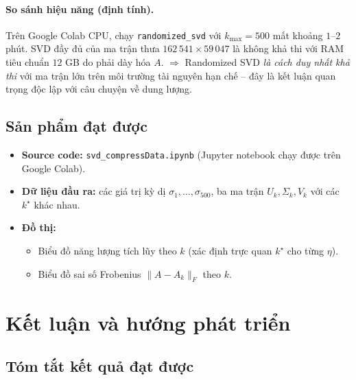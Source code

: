 \paragraph{So sánh hiệu năng (định tính).}
Trên Google Colab CPU, chạy \texttt{randomized\_svd} với $k_{\max}=500$ mất
khoảng $1$--$2$ phút. SVD đầy đủ của ma trận thưa $162\,541\times 59\,047$ là
không khả thi với RAM tiêu chuẩn $12$ GB do phải dày hóa $A$.
$\Rightarrow$ Randomized SVD \emph{là cách duy nhất khả thi} với ma trận lớn
trên môi trường tài nguyên hạn chế -- đây là kết luận quan trọng độc lập với
câu chuyện về dung lượng.

\subsection{Sản phẩm đạt được}

\begin{itemize}
    \item \textbf{Source code:} \texttt{svd\_compressData.ipynb} (Jupyter
    notebook chạy được trên Google Colab).
    \item \textbf{Dữ liệu đầu ra:} các giá trị kỳ dị $\sigma_1,\dots,\sigma_{500}$,
    ba ma trận $U_k, \Sigma_k, V_k$ với các $k^\star$ khác nhau.
    \item \textbf{Đồ thị:}
    \begin{itemize}
        \item Biểu đồ năng lượng tích lũy theo $k$ (xác định trực quan
        $k^\star$ cho từng $\eta$).
        \item Biểu đồ sai số Frobenius $\|A-A_k\|_F$ theo $k$.
    \end{itemize}
\end{itemize}


\section{Kết luận và hướng phát triển}

\subsection{Tóm tắt kết quả đạt được}

